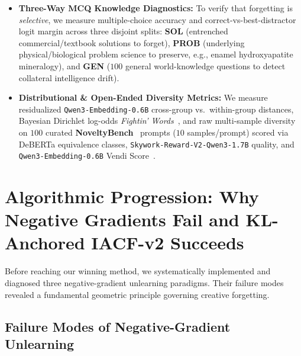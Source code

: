 \documentclass[10.5pt,letterpaper]{article}
\begin{document}
\begin{itemize}
  \item \textbf{Three-Way MCQ Knowledge Diagnostics:} To verify that forgetting is \emph{selective}, we measure multiple-choice accuracy and correct-vs-best-distractor logit margin across three disjoint splits: \textbf{SOL} (entrenched commercial/textbook solutions to forget), \textbf{PROB} (underlying physical/biological problem science to preserve, e.g., enamel hydroxyapatite mineralogy), and \textbf{GEN} ($100$ general world-knowledge questions to detect collateral intelligence drift).
  \item \textbf{Distributional \& Open-Ended Diversity Metrics:} We measure residualized \texttt{Qwen3-Embedding-0.6B} cross-group vs.\ within-group distances, Bayesian Dirichlet log-odds \emph{Fightin' Words}~\cite{monroe2008fightin}, and raw multi-sample diversity on $100$ curated \textbf{NoveltyBench}~\cite{zhang2025noveltybench} prompts ($10$ samples/prompt) scored via DeBERTa equivalence classes, \texttt{Skywork-Reward-V2-Qwen3-1.7B} quality, and \texttt{Qwen3-Embedding-0.6B} Vendi Score~\cite{friedman2023vendi}.
\end{itemize}

\section{Algorithmic Progression: Why Negative Gradients Fail and KL-Anchored IACF-v2 Succeeds}

Before reaching our winning method, we systematically implemented and diagnosed three negative-gradient unlearning paradigms. Their failure modes revealed a fundamental geometric principle governing creative forgetting.

\subsection{Failure Modes of Negative-Gradient Unlearning}
\end{document}
